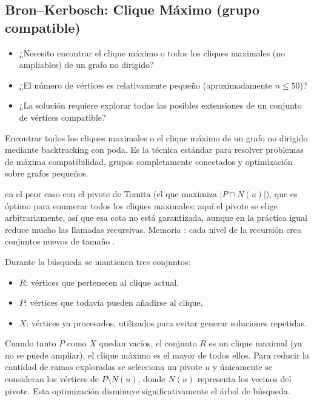 \subsection{Bron--Kerbosch: Clique Máximo (grupo compatible)}
\label{alg:4-7}


\begin{itemize}
\item ¿Necesito encontrar el clique máximo o todos los cliques maximales (no ampliables) de un grafo no dirigido?
\item ¿El número de vértices es relativamente pequeño (aproximadamente $n \le 50$)?
\item ¿La solución requiere explorar todas las posibles extensiones de un conjunto de vértices compatible?
\end{itemize}

 Encontrar todos los cliques maximales o el clique máximo de un grafo no dirigido mediante backtracking con poda. Es la técnica estándar para resolver problemas de máxima compatibilidad, grupos completamente conectados y optimización sobre grafos pequeños.

  en el peor caso con el pivote de Tomita (el que maximiza $|P \cap N(u)|$), que es óptimo para enumerar todos los cliques maximales; aquí el pivote se elige arbitrariamente, así que esa cota no está garantizada, aunque en la práctica igual reduce mucho las llamadas recursivas. Memoria : cada nivel de la recursión crea conjuntos nuevos de tamaño .

 Durante la búsqueda se mantienen tres conjuntos:
\begin{itemize}
\item $R$: vértices que pertenecen al clique actual.
\item $P$: vértices que todavía pueden añadirse al clique.
\item $X$: vértices ya procesados, utilizados para evitar generar soluciones repetidas.
\end{itemize}
Cuando tanto $P$ como $X$ quedan vacíos, el conjunto $R$ es un clique maximal (ya no se puede ampliar); el clique máximo es el mayor de todos ellos. Para reducir la cantidad de ramas exploradas se selecciona un pivote $u$ y únicamente se consideran los vértices de $P \setminus N(u)$, donde $N(u)$ representa los vecinos del pivote. Esta optimización disminuye significativamente el árbol de búsqueda.~\cite{bron1973}

